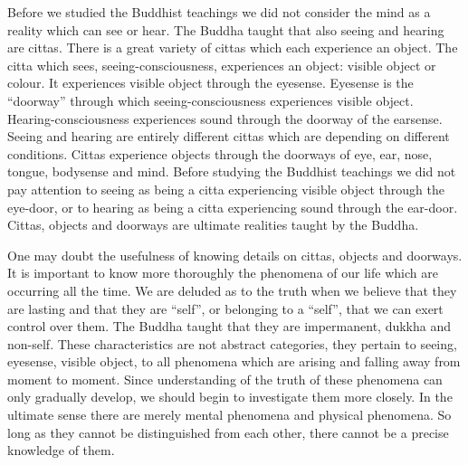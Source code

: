 \documentclass{book}
\begin{document}
Before we studied the Buddhist teachings we did not consider the mind as
a reality which can see or hear. The Buddha taught that also seeing and
hearing are cittas. There is a great variety of cittas which each
experience an object. The citta which sees, seeing-consciousness,
exper­iences an object: visible object or colour. It experiences visible
object through the eyesense. Eyesense is the ``doorway'' through which
seeing-consciousness exper­iences visible object. Hearing-consciousness
experiences sound through the doorway of the earsense. Seeing and
hearing are entirely different cittas which are depending on different
conditions. Cittas experience objects through the doorways of eye, ear,
nose, tongue, bodysense and mind. Before studying the Buddhist teachings
we did not pay attention to seeing as being a citta experiencing visible
object through the eye-door, or to hearing as being a citta experiencing
sound through the ear-door. Cittas, objects and doorways are ultimate
realities taught by the Buddha.

One may doubt the usefulness of knowing details on cittas, objects and
doorways. It is important to know more thoroughly the phenomena of our
life which are occurring all the time. We are deluded as to the truth
when we believe that they are lasting and that they are ``self'', or
belonging to a ``self'', that we can exert control over them. The Buddha
taught that they are impermanent, dukkha and non-self. These
characteristics are not abstract categories, they pertain to seeing,
eyesense, visible object, to all phenomena which are arising and
falling away from moment to moment. Since understanding of the truth of
these phenomena can only gradually develop, we should begin to
investigate them more closely. In the ultimate sense there are merely
mental phenomena and physical phenomena. So long as they cannot be
distinguished from each other, there cannot be a precise knowledge of
them.
\end{document}

